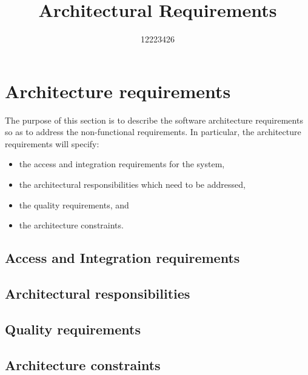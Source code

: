 \documentclass[11pt,a4paper]{article}
\begin{document}
\begin{titlepage}
\title{Architectural Requirements}
\author{12223426}
\maketitle
\end{titlepage}

\section{Architecture requirements}
The purpose of this section is to describe the software architecture requirements so as to address the non-functional requirements. In particular, the architecture requirements will specify:
\begin{itemize}
	\item the access and integration requirements for the system,
	\item the architectural responsibilities which need to be addressed,
	\item the quality requirements, and
	\item the architecture constraints.
\end{itemize}

	\subsection{Access and Integration requirements}
		
	\subsection{Architectural responsibilities}
		 
	\subsection{Quality requirements}
		 
	\subsection{ Architecture constraints}
 
\end{document}
